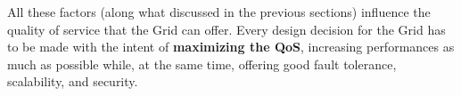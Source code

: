 All these factors (along what discussed in the previous sections) influence the quality of service that the Grid can offer. Every design decision for the Grid has to be made with the intent of \textbf{maximizing the QoS}, increasing performances as much as possible while, at the same time, offering good fault tolerance, scalability, and security.
